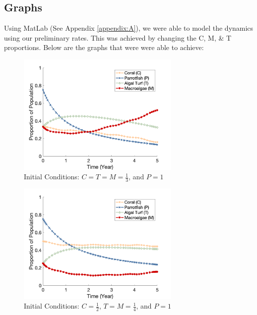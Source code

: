 \documentclass[12pt]{article}
\begin{document}
\subsection{Graphs}
Using MatLab (See Appendix \ref{appendix:A}), we were able to model the dynamics using our preliminary rates. This was achieved by changing the C, M, \& T proportions. Below are the graphs that were were able to achieve:\\
\begin{figure}[H]
    \centering
    \includegraphics[width=0.7\textwidth]{Latex/Figures/Graphs/0.3C_0.3T_0.3M.png}
    \caption{Initial Conditions: $C = T = M = \frac{1}{3}$, and $P = 1$}
    \label{fig:initial_plot}
\end{figure}
\begin{figure}[H]
    \centering
    \includegraphics[width=0.7\textwidth]{Latex/Figures/Graphs/0.5C_0.25T_0.25M.png}
    \caption{Initial Conditions: $C = \frac{1}{2}$, $T = M = \frac{1}{4}$, and $P = 1$}
    \label{fig:coral_dominant}
\end{figure}
\end{document}
